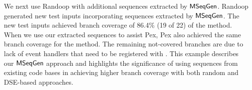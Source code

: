 We next use Randoop with additional sequences extracted by $\textsf{MSeqGen} $. Randoop generated new test inputs incorporating  sequences extracted by $\textsf{MSeqGen} $. The new test inputs achieved branch coverage of 86.4\% (19 of 22) of the  method. When we use our extracted sequences to assist Pex, Pex also achieved the same branch coverage for the  method. The remaining not-covered branches are due to lack of event handlers that need to be registered with . This example describes our $\textsf{MSeqGen} $ approach and highlights the significance of using sequences from existing code bases in achieving higher branch coverage with both random and DSE-based approaches.